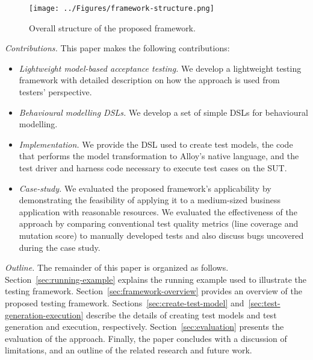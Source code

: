 \begin{figure}[!t]
\centering
\texttt{[image: ../Figures/framework-structure.png]}
\caption{Overall structure of the proposed framework.}
\label{fig:framework-structure}
\end{figure}

\textit{Contributions.} This paper makes the following
contributions:
\begin{itemize}
	\item \textit{Lightweight model-based acceptance testing.} We develop a lightweight testing framework with detailed description on how the approach is used from testers' perspective.
	
	\item \textit{Behavioural modelling DSLs.} We develop a set of simple DSLs for behavioural modelling.
	
	\item \textit{Implementation.} We provide the DSL used to create test models, the code that
	performs the model transformation to Alloy's native language, and the test driver and harness code necessary to execute test cases on the SUT.

	\item \textit{Case-study. } We evaluated the proposed framework's applicability by demonstrating the feasibility of applying it to 
a medium-sized business application with reasonable resources.
We evaluated the effectiveness of the approach by comparing conventional test quality metrics (line coverage and mutation score)
to manually developed tests and also discuss bugs uncovered during the case study.

\end{itemize}

\textit{Outline.} The remainder of this paper is organized as follows.  %
Section~\ref{sec:running-example} explains the running example used to illustrate the testing framework. Section~\ref{sec:framework-overview} provides an overview of the proposed testing framework. Sections~\ref{sec:create-test-model} and~\ref{sec:test-generation-execution} describe the details of creating test models and test generation and execution, respectively. Section~\ref{sec:evaluation} presents the evaluation of the approach. Finally, the paper concludes with a discussion of limitations, and an outline of the related research and future work.
